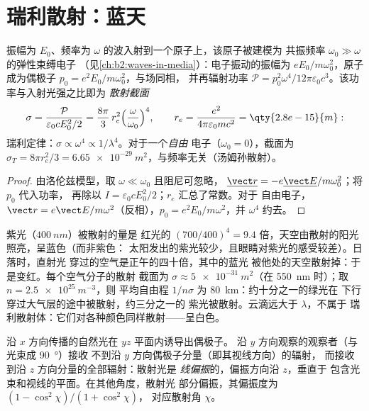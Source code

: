 \section{瑞利散射：蓝天}

\begin{proposition}[束缚电子的散射]\label{prop:b2:dipole-radiation:rayleigh}
振幅为 $E_0$、频率为 $\omega$ 的波入射到一个原子上，该原子被建模为
共振频率 $\omega_0 \gg \omega$ 的弹性束缚电子
（见\cref{ch:b2:waves-in-media}）：电子振动的振幅为
$eE_0/m\omega_0^2$，原子成为偶极子 $p_0 = e^2E_0/m\omega_0^2$，与场同相，
并再辐射功率 $\mathcal P = p_0^2\omega^4/12\pi
\varepsilon_0c^3$。该功率与入射光强之比即为
\emph{散射截面}
\[
\sigma = \frac{\mathcal P}{\varepsilon_0cE_0^2/2} = \frac{8\pi}3\,r_e^2\Bigl(\frac\omega{\omega_0}\Bigr)^4 ,
\qquad r_e = \frac{e^2}{4\pi\varepsilon_0mc^2} = \qty{2.8e-15}{m} :
\]
瑞利定律：$\sigma \propto \omega^4 \propto 1/\lambda^4$。对于一个\emph{自由}
电子（$\omega_0 = 0$），截面为 $\sigma_T = 8\pi r_e^2/3 =
\qty{6.65e-29}{m^2}$，与频率无关（汤姆孙散射）。
\end{proposition}

\begin{proof}
由洛伦兹模型，取 $\omega \ll \omega_0$ 且阻尼可忽略，
$\underline{\vect r} = -e\underline{\vect E}/m\omega_0^2$；将 $p_0$ 代入功率，
再除以 $I = \varepsilon_0cE_0^2/2$；$r_e$ 汇总了常数。对于
自由电子，$\vect r = e\vect E/m\omega^2$（反相），$p_0 = e^2E_0/m\omega^2$，并
$\omega^4$ 约去。
\end{proof}

\begin{example}[蓝天、红色日落、白云]\label{ex:b2:dipole-radiation:sky}
紫光（$\qty{400}{nm}$）被散射的量是
红光的 $(700/400)^4 = 9.4$ 倍，天空由散射的阳光照亮，呈蓝色（而非紫色：
太阳发出的紫光较少，且眼睛对紫光的感受较差）。日落时，直射光
穿过的空气是正午的四十倍，其中的蓝光
被他处的天空散射掉：于是变红。每个空气分子的散射
截面为 $\sigma \approx \qty{5e-31}{m^2}$（在 \qty{550}{nm} 时）；取 $n = \qty{2.5e25}{m^{-3}}$，则
平均自由程 $1/n\sigma$ 为 \qty{80}{km}：约十分之一的绿光在
下行穿过大气层的途中被散射，约三分之一的
紫光被散射。云滴远大于 $\lambda$，不属于
瑞利散射体：它们对各种颜色同样散射——呈白色。
\end{example}

\begin{proposition}[散射引起的偏振]\label{prop:b2:dipole-radiation:polarization}
沿 $x$ 方向传播的自然光在 $yz$ 平面内诱导出偶极子。
沿 $y$ 方向观察的观察者（与光束成 \qty{90}{\degree}）接收
不到沿 $y$ 方向偶极子分量（即其视线方向）的辐射，
而接收到沿 $z$ 方向分量的全部辐射：散射光是
\emph{线偏振}的，偏振方向沿 $z$，垂直于
包含光束和视线的平面。在其他角度，散射光
部分偏振，其偏振度为 $(1 - \cos^2\chi)/(1 + \cos^2\chi)$，
对应散射角 $\chi$。
\end{proposition}

